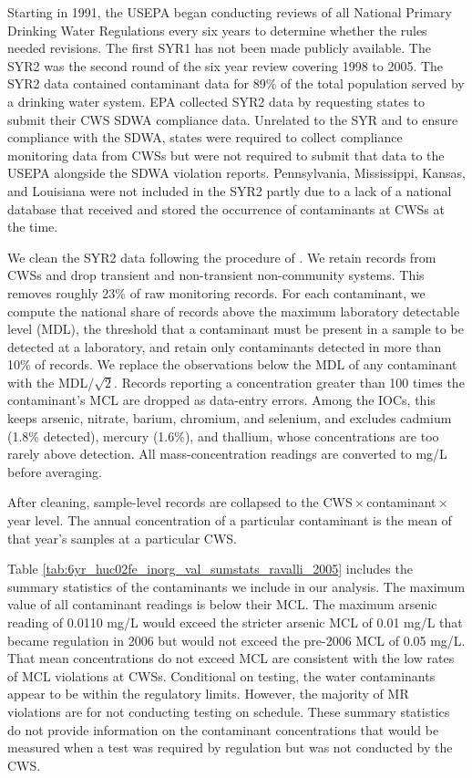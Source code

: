 \documentclass{article}
\begin{document}
Starting in 1991, the USEPA began conducting reviews of all National Primary Drinking Water Regulations every six years to determine whether the rules needed revisions. The first SYR1 has not been made publicly available. The SYR2 was the second round of the six year review covering 1998 to 2005. The SYR2 data contained contaminant data for 89\% of the total population served by a drinking water system. EPA collected SYR2 data by requesting states to submit their CWS SDWA compliance data. Unrelated to the SYR and to ensure compliance with the SDWA, states were required to collect compliance monitoring data from CWSs but were not required to submit that data to the USEPA alongside the SDWA violation reports.  Pennsylvania, Mississippi, Kansas, and Louisiana were not included in the SYR2 partly due to a lack of a national database that received and stored the occurrence of contaminants at CWSs at the time.

We clean the SYR2 data following the procedure of \cite{ravalli2022sociodemographic}. We retain records from CWSs and drop transient and non-transient non-community systems. This removes roughly 23\% of raw monitoring records. For each contaminant, we compute the national share of records above the maximum laboratory detectable level (MDL), the threshold that a contaminant must be present in a sample to be detected at a laboratory, and retain only contaminants detected in more than 10\% of records. We replace the observations below the MDL of any contaminant with the MDL/$\sqrt{2}$. Records reporting a concentration greater than 100 times the contaminant's MCL are dropped as data-entry errors. Among the IOCs, this keeps arsenic, nitrate, barium, chromium, and selenium, and excludes cadmium (1.8\% detected), mercury (1.6\%), and thallium, whose concentrations are too rarely above detection. All mass-concentration readings are converted to mg/L before averaging.

After cleaning, sample-level records are collapsed to the CWS\,$\times$\,contaminant\,$\times$\,year level. The annual concentration of a particular contaminant is the mean of that year's samples at a particular CWS.

Table \ref{tab:6yr_huc02fe_inorg_val_sumstats_ravalli_2005} includes the summary statistics of the contaminants we include in our analysis. The maximum value of all contaminant readings is below their MCL. The maximum arsenic reading of 0.0110 mg/L would exceed the stricter arsenic MCL of 0.01 mg/L that became regulation in 2006 but would not exceed the pre-2006 MCL of 0.05 mg/L. That mean concentrations do not exceed MCL are consistent with the low rates of MCL violations at CWSs. Conditional on testing, the water contaminants appear to be within the regulatory limits. However, the majority of MR violations are for not conducting testing on schedule. These summary statistics do not provide information on the contaminant concentrations that would be measured when a test was required by regulation but was not conducted by the CWS.
\end{document}
